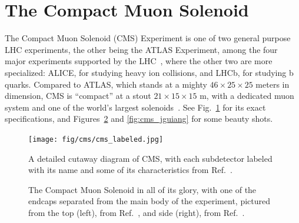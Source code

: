 \section{The Compact Muon Solenoid}\label{sec:cms}
The Compact Muon Solenoid (CMS) Experiment is one of two general purpose LHC experiments, the other being the ATLAS\footnotemark{} Experiment, among the four major experiments supported by the LHC~\cite{LHCWeb}, where the other two are more specialized: ALICE, for studying heavy ion collisions, and LHCb, for studying b quarks. 
Compared to ATLAS, which stands at a mighty $46\times25\times25$ meters in dimension, CMS is ``compact'' at a stout $21\times15\times15$ m, with a dedicated muon system and one of the world's largest solenoids~\cite{ATLASWeb, CMSWeb}. 
See Fig.~\ref{fig:cms_labeled} for its exact specifications, and Figures~\ref{fig:cms_pics} and \ref{fig:cms_jguiang} for some beauty shots. 

\begin{figure}[htb]
    \centering
    \texttt{[image: fig/cms/cms\_labeled.jpg]}
    \caption{
        A detailed cutaway diagram of CMS, with each subdetector labeled with its name and some of its characteristics from Ref.~\cite{Sakuma:2665537}. 
    }
    \label{fig:cms_labeled}
\end{figure}

\begin{figure}[htb]
    \centering
    \quad
    \caption[The Compact Muon Solenoid in all of its glory, with one of the endcaps separated from the main body of the experiment, pictured from the top and side]{
        The Compact Muon Solenoid in all of its glory, with one of the endcaps separated from the main body of the experiment, pictured from the top (left), from Ref.~\cite{Brice:2254952}, and side (right), from Ref.~\cite{Maximilien:1133594}. 
    }
    \label{fig:cms_pics}
\end{figure}

